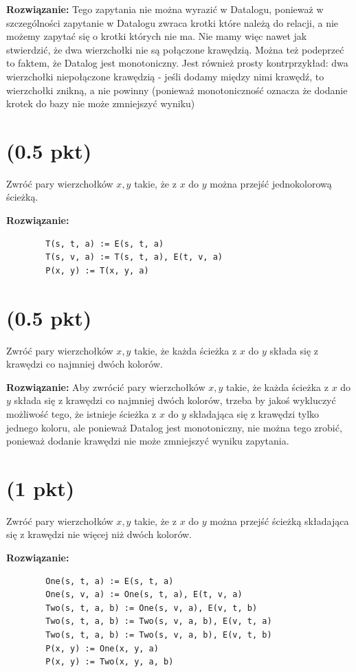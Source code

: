 \documentclass{article}
\begin{document}
\textbf{Rozwiązanie:} Tego zapytania nie można wyrazić w Datalogu, ponieważ w szczególności zapytanie w Datalogu zwraca krotki które należą do relacji, a nie możemy zapytać się o krotki których nie ma. Nie mamy więc nawet jak stwierdzić, że dwa wierzchołki nie są połączone krawędzią. Można też podeprzeć to faktem, że Datalog jest monotoniczny. Jest również prosty kontrprzykład: dwa wierzchołki niepołączone krawędzią - jeśli dodamy między nimi krawędź, to wierzchołki znikną, a nie powinny (ponieważ monotoniczność oznacza że dodanie krotek do bazy nie może zmniejszyć wyniku)

\section{(0.5 pkt)} Zwróć pary wierzchołków $x, y$ takie, że z $x$ do $y$ można przejść jednokolorową ścieżką.

\textbf{Rozwiązanie:}
\begin{verbatim}
        T(s, t, a) := E(s, t, a)
        T(s, v, a) := T(s, t, a), E(t, v, a)
        P(x, y) := T(x, y, a)
\end{verbatim}


\section{(0.5 pkt)} Zwróć pary wierzchołków $x, y$ takie, że każda ścieżka z $x$ do $y$ składa się z krawędzi co najmniej dwóch kolorów.

\textbf{Rozwiązanie:} Aby zwrócić pary wierzchołków $x, y$ takie, że każda ścieżka z $x$ do $y$ składa się z krawędzi co najmniej dwóch kolorów, trzeba by jakoś wykluczyć możliwość tego, że istnieje ścieżka z $x$ do $y$ składająca się z krawędzi tylko jednego koloru, ale ponieważ Datalog jest monotoniczny, nie można tego zrobić, ponieważ dodanie krawędzi nie może zmniejszyć wyniku zapytania.

\section{(1 pkt)} Zwróć pary wierzchołków $x,y$ takie, że z $x$ do $y$ można przejść ścieżką składająca się z krawędzi nie więcej niż dwóch kolorów.

\textbf{Rozwiązanie:}
\begin{verbatim}
        One(s, t, a) := E(s, t, a)
        One(s, v, a) := One(s, t, a), E(t, v, a)
        Two(s, t, a, b) := One(s, v, a), E(v, t, b)
        Two(s, t, a, b) := Two(s, v, a, b), E(v, t, a)
        Two(s, t, a, b) := Two(s, v, a, b), E(v, t, b)
        P(x, y) := One(x, y, a)
        P(x, y) := Two(x, y, a, b)
\end{verbatim}
\end{document}
